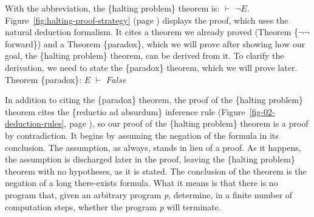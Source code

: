 With the abbreviation, the \{halting problem\} theorem is: $\vdash$ $\neg E$.
Figure~\ref{fig:halting-proof-strategy} (page \pageref{fig:halting-proof-strategy})
displays the proof, which uses the natural deduction formalism.
It cites a theorem we already proved (Theorem \{$\neg \neg$ forward\}) and
a Theorem \{paradox\}, which we will prove
after showing how our goal, the \{halting problem\} theorem,
can be derived from it.
To clarify the derivation, we need to state the \{paradox\} theorem,
which we will prove later.
\vspace{2mm}\\
\hspace*{5mm}Theorem \{paradox\}: $E$ $\vdash$ $False$
\vspace{2mm}

In addition to citing the \{paradox\} theorem,
the proof of the \{halting problem\} theorem
cites the \{reductio ad absurdum\} inference rule
(Figure~\ref{fig-02-deduction-rules}, page \pageref{fig-02-deduction-rules}),
so our proof of the \{halting problem\} theorem is a proof by contradiction.
It begins by assuming the negation of the formula in its conclusion.
The assumption, as always, stands in lieu of a proof.
As it happens, the assumption is discharged later in the proof,
leaving the \{halting problem\} theorem with no hypotheses,
as it is stated.
The conclusion of the theorem is the negation of a long there-exists formula.
What it means is that there is no program that, given an arbitrary program \emph{p},
determine, in a finite number of computation steps,
whether the program \emph{p} will terminate.

